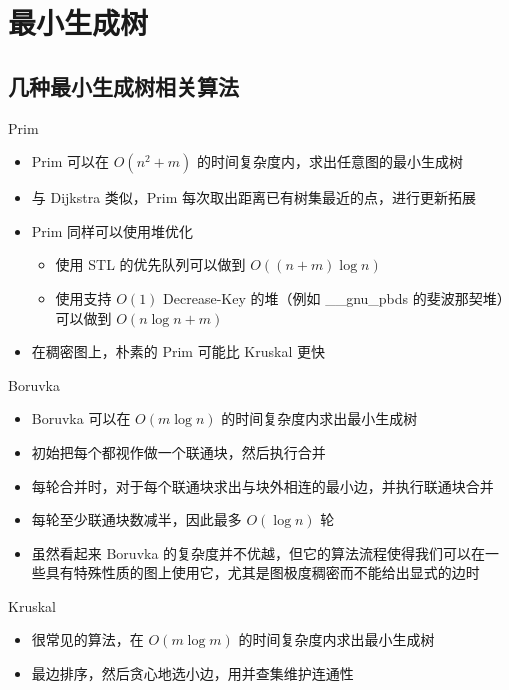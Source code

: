 ﻿\documentclass[aspectratio=169]{ctexbeamer}
\begin{document}
\section{最小生成树}

\subsection{几种最小生成树相关算法}

\begin{frame}{Prim}
    \begin{itemize}
        \item Prim 可以在 $O(n^2+m)$ 的时间复杂度内，求出任意图的最小生成树
        \item 与 Dijkstra 类似，Prim 每次取出距离已有树集最近的点，进行更新拓展
        \item Prim 同样可以使用堆优化
        \begin{itemize}
            \item 使用 STL 的优先队列可以做到 $O((n+m)\log n)$
            \item 使用支持 $O(1)$ Decrease-Key 的堆（例如 \_\_gnu\_pbds 的斐波那契堆）可以做到 $O(n\log n+m)$
        \end{itemize}
        \item 在稠密图上，朴素的 Prim 可能比 Kruskal 更快
    \end{itemize}
\end{frame}

\begin{frame}{Boruvka}
    \begin{itemize}
        \item Boruvka 可以在 $O(m\log n)$ 的时间复杂度内求出最小生成树
        \item 初始把每个都视作做一个联通块，然后执行合并
        \item 每轮合并时，对于每个联通块求出与块外相连的最小边，并执行联通块合并
        \item 每轮至少联通块数减半，因此最多 $O(\log n)$ 轮
        \item 虽然看起来 Boruvka 的复杂度并不优越，但它的算法流程使得我们可以在一些具有特殊性质的图上使用它，尤其是图极度稠密而不能给出显式的边时
    \end{itemize}
\end{frame}

\begin{frame}{Kruskal}
    \begin{itemize}
        \item 很常见的算法，在 $O(m\log m)$ 的时间复杂度内求出最小生成树
        \item 最边排序，然后贪心地选小边，用并查集维护连通性
    \end{itemize}
\end{frame}
\end{document}
